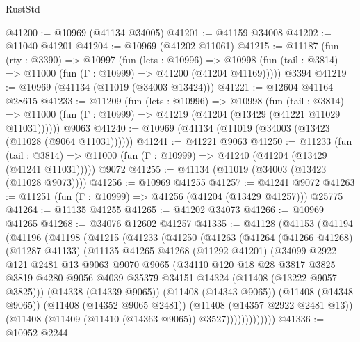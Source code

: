 \begin{lexlean}{RustStd}
\begin{coremodule}
@41200 := @10969 (@41134 @34005)
@41201 := @41159 @34008
@41202 := @11040 @41201
@41204 := @10969 (@41202 @11061)
@41215 := @11187
    (fun (rty : @3390) =>
    @10997
      (fun (lets : @10996) =>
      @10998 (fun (tail : @3814) => @11000 (fun (Γ : @10999) => @41200 (@41204 @41169)))))
    @3394
@41219 := @10969 (@41134 (@11019 (@34003 @13424)))
@41221 := @12604 @41164 @28615
@41233 := @11209
    (fun (lets : @10996) =>
    @10998
      (fun (tail : @3814) =>
      @11000 (fun (Γ : @10999) => @41219 (@41204 (@13429 (@41221 @11029 @11031))))))
    @9063
@41240 := @10969 (@41134 (@11019 (@34003 (@13423 (@11028 (@9064 @11031))))))
@41241 := @41221 @9063
@41250 := @11233
    (fun (tail : @3814) => @11000 (fun (Γ : @10999) => @41240 (@41204 (@13429 (@41241 @11031)))))
    @9072
@41255 := @41134 (@11019 (@34003 (@13423 (@11028 @9073))))
@41256 := @10969 @41255
@41257 := @41241 @9072
@41263 := @11251 (fun (Γ : @10999) => @41256 (@41204 (@13429 @41257))) @25775
@41264 := @11135 @41255
@41265 := @41202 @34073
@41266 := @10969 @41265
@41268 := @34076 @12602 @41257
@41335 := @41128
    (@41153
      (@41194
        (@41196
          (@41198
            (@41215
              (@41233
                (@41250
                  (@41263
                    (@41264
                      (@41266 @41268)
                      (@11287 @41133)
                      (@11135
                        @41265
                        @41268
                        (@11292 @41201)
                        (@34099
                          @2922
                          @121
                          @2481
                          @13
                          @9063
                          @9070
                          @9065
                          (@34110
                            @120
                            @18
                            @28
                            @3817
                            @3825
                            @3819
                            @4280
                            @9056
                            @4039
                            @35379
                            @34151
                            @14324
                            (@11408 (@13222 @9057 @3825)))
                          (@14338 (@14339 @9065))
                          (@11408 (@14343 @9065))
                          (@11408 (@14348 @9065))
                          (@11408 (@14352 @9065 @2481))
                          (@11408 (@14357 @2922 @2481 @13))
                          (@11408 (@11409 (@11410 (@14363 @9065)) @3527)))))))))))))
@41336 := @10952 @2244

\end{coremodule}
\end{lexlean}
